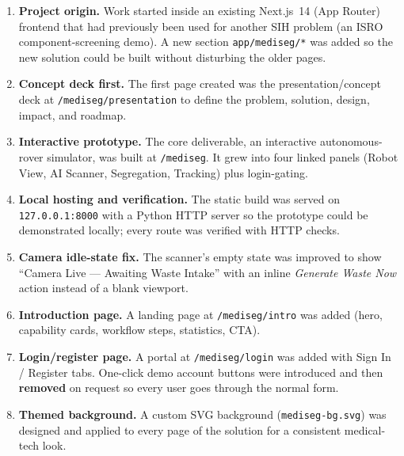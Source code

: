 \documentclass[11pt, a4paper]{article}
\begin{document}
\begin{enumerate}[leftmargin=1.6em, itemsep=4pt]
  \item \textbf{Project origin.} Work started inside an existing Next.js~14
        (App Router) frontend that had previously been used for another SIH
        problem (an ISRO component-screening demo). A new section
        \texttt{app/mediseg/*} was added so the new solution could be built
        without disturbing the older pages.

  \item \textbf{Concept deck first.} The first page created was the
        presentation/concept deck at \texttt{/mediseg/presentation} to define
        the problem, solution, design, impact, and roadmap.

  \item \textbf{Interactive prototype.} The core deliverable, an interactive
        autonomous-rover simulator, was built at \texttt{/mediseg}. It grew
        into four linked panels (Robot View, AI Scanner, Segregation,
        Tracking) plus login-gating.

  \item \textbf{Local hosting and verification.} The static build was served on
        \texttt{127.0.0.1:8000} with a Python HTTP server so the prototype
        could be demonstrated locally; every route was verified with HTTP
        checks.

  \item \textbf{Camera idle-state fix.} The scanner's empty state was improved
        to show ``Camera Live --- Awaiting Waste Intake'' with an inline
        \emph{Generate Waste Now} action instead of a blank viewport.

  \item \textbf{Introduction page.} A landing page at \texttt{/mediseg/intro}
        was added (hero, capability cards, workflow steps, statistics, CTA).

  \item \textbf{Login/register page.} A portal at \texttt{/mediseg/login} was
        added with Sign In / Register tabs. One-click demo account buttons were
        introduced and then \textbf{removed} on request so every user goes
        through the normal form.

  \item \textbf{Themed background.} A custom SVG background
        (\texttt{mediseg-bg.svg}) was designed and applied to every page of the
        solution for a consistent medical-tech look.


\end{enumerate}
\end{document}
